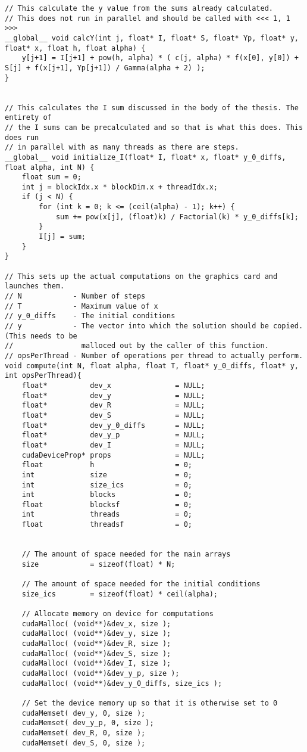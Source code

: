 \begin{lstlisting}
// This calculate the y value from the sums already calculated.
// This does not run in parallel and should be called with <<< 1, 1 >>>
__global__ void calcY(int j, float* I, float* S, float* Yp, float* y, float* x, float h, float alpha) {
    y[j+1] = I[j+1] + pow(h, alpha) * ( c(j, alpha) * f(x[0], y[0]) + S[j] + f(x[j+1], Yp[j+1]) / Gamma(alpha + 2) );
}


// This calculates the I sum discussed in the body of the thesis. The entirety of
// the I sums can be precalculated and so that is what this does. This does run
// in parallel with as many threads as there are steps.
__global__ void initialize_I(float* I, float* x, float* y_0_diffs, float alpha, int N) {
	float sum = 0;
	int j = blockIdx.x * blockDim.x + threadIdx.x;
    if (j < N) {
        for (int k = 0; k <= (ceil(alpha) - 1); k++) {
			sum += pow(x[j], (float)k) / Factorial(k) * y_0_diffs[k];
		}
		I[j] = sum;
    }
}

// This sets up the actual computations on the graphics card and launches them.
// N 			- Number of steps
// T 			- Maximum value of x
// y_0_diffs 	- The initial conditions
// y			- The vector into which the solution should be copied. (This needs to be
//				  malloced out by the caller of this function.
// opsPerThread	- Number of operations per thread to actually perform.
void compute(int N, float alpha, float T, float* y_0_diffs, float* y, int opsPerThread){
	float* 			dev_x 				= NULL;
	float* 			dev_y 				= NULL;
	float* 			dev_R				= NULL;
	float* 			dev_S				= NULL;
	float*			dev_y_0_diffs		= NULL;
	float* 			dev_y_p				= NULL;
	float* 			dev_I				= NULL;
	cudaDeviceProp* props				= NULL;	
	float 			h					= 0;
	int 			size				= 0;
	int 			size_ics			= 0;
	int 			blocks				= 0;
	float 			blocksf				= 0;
	int 			threads				= 0;
	float 			threadsf			= 0;
	
	
	// The amount of space needed for the main arrays
	size 			= sizeof(float) * N;
	
	// The amount of space needed for the initial conditions
	size_ics		= sizeof(float) * ceil(alpha);
	
	// Allocate memory on device for computations
	cudaMalloc( (void**)&dev_x, size );
	cudaMalloc( (void**)&dev_y, size );
	cudaMalloc( (void**)&dev_R, size );
	cudaMalloc( (void**)&dev_S, size );
	cudaMalloc( (void**)&dev_I, size );
	cudaMalloc( (void**)&dev_y_p, size );
	cudaMalloc( (void**)&dev_y_0_diffs, size_ics );
	
	// Set the device memory up so that it is otherwise set to 0
	cudaMemset( dev_y, 0, size );
	cudaMemset( dev_y_p, 0, size );
	cudaMemset( dev_R, 0, size );
	cudaMemset( dev_S, 0, size );
	

\end{lstlisting}
